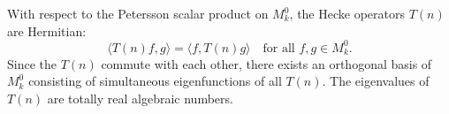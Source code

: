 With respect to the Petersson scalar product on $M_k^0$, the Hecke operators $T(n)$ are Hermitian:
$$\langle T(n)f, g \rangle = \langle f, T(n)g \rangle \quad \text{for all } f, g \in M_k^0.$$
Since the $T(n)$ commute with each other, there exists an orthogonal basis of $M_k^0$ consisting of simultaneous eigenfunctions of all $T(n)$. The eigenvalues of $T(n)$ are totally real algebraic numbers.

